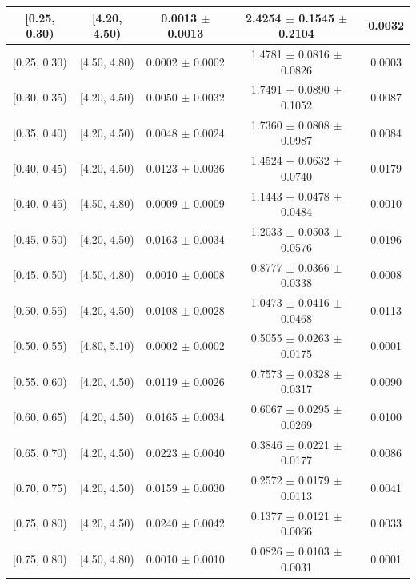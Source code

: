 \begin{longtable}{|c|c|c|c|c|}
\hline
\endlastfoot
[0.25, 0.30) & [4.20, 4.50) & 0.0013 $\pm$ 0.0013 & 2.4254 $\pm$ 0.1545 $\pm$ 0.2104 & 0.0032 \\ 
\hline
[0.25, 0.30) & [4.50, 4.80) & 0.0002 $\pm$ 0.0002 & 1.4781 $\pm$ 0.0816 $\pm$ 0.0826 & 0.0003 \\ 
\hline
[0.30, 0.35) & [4.20, 4.50) & 0.0050 $\pm$ 0.0032 & 1.7491 $\pm$ 0.0890 $\pm$ 0.1052 & 0.0087 \\ 
\hline
[0.35, 0.40) & [4.20, 4.50) & 0.0048 $\pm$ 0.0024 & 1.7360 $\pm$ 0.0808 $\pm$ 0.0987 & 0.0084 \\ 
\hline
[0.40, 0.45) & [4.20, 4.50) & 0.0123 $\pm$ 0.0036 & 1.4524 $\pm$ 0.0632 $\pm$ 0.0740 & 0.0179 \\ 
\hline
[0.40, 0.45) & [4.50, 4.80) & 0.0009 $\pm$ 0.0009 & 1.1443 $\pm$ 0.0478 $\pm$ 0.0484 & 0.0010 \\ 
\hline
[0.45, 0.50) & [4.20, 4.50) & 0.0163 $\pm$ 0.0034 & 1.2033 $\pm$ 0.0503 $\pm$ 0.0576 & 0.0196 \\ 
\hline
[0.45, 0.50) & [4.50, 4.80) & 0.0010 $\pm$ 0.0008 & 0.8777 $\pm$ 0.0366 $\pm$ 0.0338 & 0.0008 \\ 
\hline
[0.50, 0.55) & [4.20, 4.50) & 0.0108 $\pm$ 0.0028 & 1.0473 $\pm$ 0.0416 $\pm$ 0.0468 & 0.0113 \\ 
\hline
[0.50, 0.55) & [4.80, 5.10) & 0.0002 $\pm$ 0.0002 & 0.5055 $\pm$ 0.0263 $\pm$ 0.0175 & 0.0001 \\ 
\hline
[0.55, 0.60) & [4.20, 4.50) & 0.0119 $\pm$ 0.0026 & 0.7573 $\pm$ 0.0328 $\pm$ 0.0317 & 0.0090 \\ 
\hline
[0.60, 0.65) & [4.20, 4.50) & 0.0165 $\pm$ 0.0034 & 0.6067 $\pm$ 0.0295 $\pm$ 0.0269 & 0.0100 \\ 
\hline
[0.65, 0.70) & [4.20, 4.50) & 0.0223 $\pm$ 0.0040 & 0.3846 $\pm$ 0.0221 $\pm$ 0.0177 & 0.0086 \\ 
\hline
[0.70, 0.75) & [4.20, 4.50) & 0.0159 $\pm$ 0.0030 & 0.2572 $\pm$ 0.0179 $\pm$ 0.0113 & 0.0041 \\ 
\hline
[0.75, 0.80) & [4.20, 4.50) & 0.0240 $\pm$ 0.0042 & 0.1377 $\pm$ 0.0121 $\pm$ 0.0066 & 0.0033 \\ 
\hline
[0.75, 0.80) & [4.50, 4.80) & 0.0010 $\pm$ 0.0010 & 0.0826 $\pm$ 0.0103 $\pm$ 0.0031 & 0.0001 \\ 
\hline
\end{longtable}
